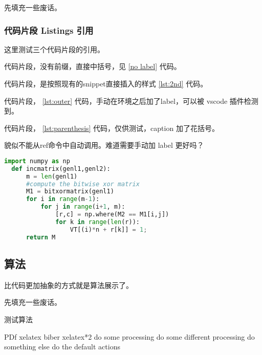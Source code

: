 \documentclass[../Main/thesis]{subfiles}
\begin{document}
先填充一些废话。\zhlipsum[12]

\subsubsection{代码片段 Listings 引用}

这里测试三个代码片段的引用。

代码片段，没有前缀，直接中括号，见 \ref{no label} 代码。

代码片段，是按照现有的snippet直接插入的样式 \ref{lst:2nd} 代码。

代码片段， \ref{lst:outer} 代码，手动在环境之后加了label，可以被 vscode 插件检测到。

代码片段， \ref{lst:parenthesis} 代码，仅供测试，caption 加了花括号。

貌似不能从ref命令中自动调用。难道需要手动加 label 更好吗？
\begin{lstlisting}[language=Python,
  caption={Must have Parenthesis},
  label=lst:parenthesis]
  import numpy as np
  def incmatrix(genl1,genl2):
      m = len(genl1)
      #compute the bitwise xor matrix
      M1 = bitxormatrix(genl1)
      for i in range(m-1):
          for j in range(i+1, m):
              [r,c] = np.where(M2 == M1[i,j])
              for k in range(len(r)):
                  VT[(i)*n + r[k]] = 1;
      return M
\end{lstlisting}
\subsection{算法}
\label{ssc:algo}

比代码更加抽象的方式就是算法展示了。

先填充一些废话。\zhlipsum[7]

\begin{minipage}{0.75\textwidth}

\begin{algorithm}[H]
  \caption{测试算法}
  \label{alg:test}
    \begin{algorithmic}[1]
      \REQUIRE PDf
      \ENSURE xelatex biber xelatex*2
      \STATE do some processing
      \STATE do some different processing
      \STATE do something else
      \ELSE
      \STATE do the default actions
      \ENDIF
    \end{algorithmic}
  \end{algorithm}

\end{minipage}
\newline
\end{document}

